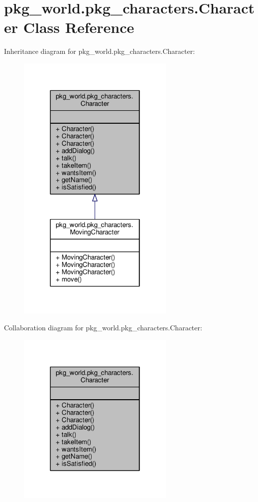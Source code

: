 \hypertarget{classpkg__world_1_1pkg__characters_1_1Character}{\section{pkg\-\_\-world.\-pkg\-\_\-characters.\-Character Class Reference}
\label{classpkg__world_1_1pkg__characters_1_1Character}
}


Inheritance diagram for pkg\-\_\-world.\-pkg\-\_\-characters.\-Character\-:
\nopagebreak
\begin{figure}[H]
\begin{center}
\leavevmode
\includegraphics[width=214pt]{classpkg__world_1_1pkg__characters_1_1Character__inherit__graph}
\end{center}
\end{figure}


Collaboration diagram for pkg\-\_\-world.\-pkg\-\_\-characters.\-Character\-:
\nopagebreak
\begin{figure}[H]
\begin{center}
\leavevmode
\includegraphics[width=214pt]{classpkg__world_1_1pkg__characters_1_1Character__coll__graph}
\end{center}
\end{figure}
